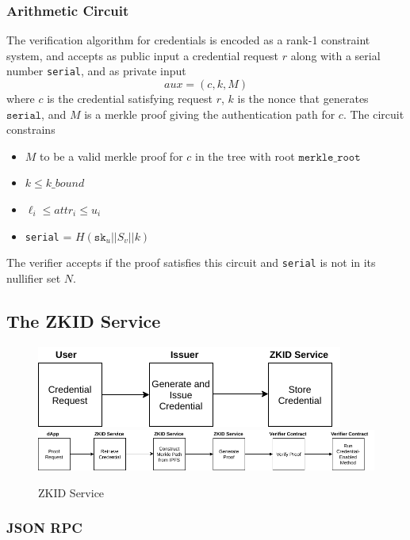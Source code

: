 \documentclass[11 pt]{extarticle}
\theoremstyle{remark}
\begin{document}
\subsubsection{Arithmetic Circuit}
The verification algorithm for credentials is encoded as a rank-1 constraint
system, and accepts as public input a credential request $r$ along with a serial
number \texttt{serial}, and as private
input
\begin{equation*}
  aux = (c, k, M)
\end{equation*}
where $c$ is the credential satisfying request $r$, $k$ is the nonce that
generates $\texttt{serial}$, and $M$ is a merkle proof giving the authentication
path for $c$. The circuit constrains
\begin{itemize}
\item $M$ to be a valid merkle proof for $c$ in
  the tree with root $\texttt{merkle\_root}$
\item $k \leq k\_bound$
  \item  $\ell_i\leq
    attr_i\leq u_i$
  \item \texttt{serial} = $ H(\texttt{sk}_u || S_v || k)$
\end{itemize}

The verifier accepts if the proof satisfies this circuit and \texttt{serial} is
not in its nullifier set $N$.


\subsection{The ZKID Service}
\begin{figure}[h]
  \centering
  \includegraphics[scale=0.5]{issuing}\vspace{40pt}
  \includegraphics[scale=0.5]{verifying}
  \caption{ZKID Service}
\end{figure}
\subsubsection{JSON RPC}
\end{document}
